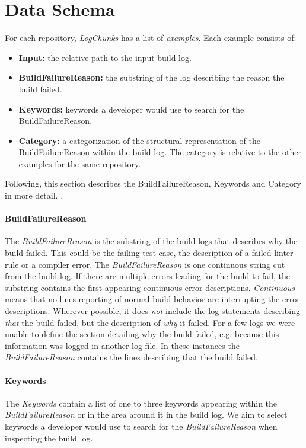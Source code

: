 \documentclass[\myrootdir/main.tex]{subfiles}
\begin{document}
\section{Data Schema}
For each repository, \emph{LogChunks} has a list of \emph{examples}.
Each example consists of:
\begin{itemize}
	\item \textbf{Input:} the relative path to the input build log.
	\item \textbf{BuildFailureReason:} the substring of the log describing the reason the build failed.
	\item \textbf{Keywords:} keywords a developer would use to search for the BuildFailureReason.
	\item \textbf{Category:} a categorization of the structural representation of the BuildFailureReason within the build log.
				The category is relative to the other examples for the same repository.
\end{itemize}
Following, this section describes the BuildFailureReason, Keywords and Category in more detail.
.

\paragraph{BuildFailureReason}
The \emph{BuildFailureReason} is the substring of the build logs that describes why the build failed.
This could be the failing test case, the description of a failed linter rule or a compiler error.
The \emph{BuildFailureReason} is one continuous string cut from the build log.
If there are multiple errors leading for the build to fail, the substring contains the first appearing continuous error descriptions.
\emph{Continuous} means that no lines reporting of normal build behavior are interrupting the error descriptions.
Wherever possible, it does \emph{not} include the log statements describing \emph{that} the build failed, but the description of \emph{why} it failed.
For a few logs we were unable to define the section detailing why the build failed, e.g. because this information was logged in another log file.
In these instances the \emph{BuildFailureReason} contains the lines describing that the build failed.

\paragraph{Keywords}
The \emph{Keywords} contain a list of one to three keywords appearing within the \emph{BuildFailureReason} or in the area around it in the build log.
We aim to select keywords a developer would use to search for the \emph{BuildFailureReason} when inspecting the build log.
\end{document}

